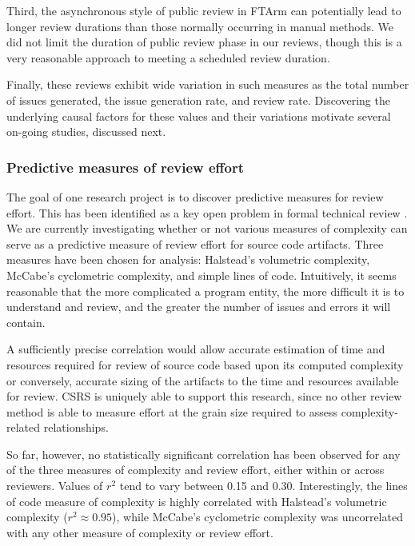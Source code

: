 Third, the asynchronous style of public review in FTArm can potentially
lead to longer review durations than those normally occurring in manual
methods. We did not limit the duration of public review phase in our
reviews, though this is a very reasonable approach to meeting a scheduled
review duration.

Finally, these reviews exhibit wide variation in such measures as the total
number of issues generated, the issue generation rate, and review rate.
Discovering the underlying causal factors for these values and their
variations motivate several on-going studies, discussed next.

\subsubsection{Predictive measures of review effort}

The goal of one research project is to discover predictive measures for
review effort. This has been identified as a key open problem in formal
technical review \cite{Fagan86}.  We are currently investigating whether or
not various measures of complexity can serve as a predictive measure of
review effort for source code artifacts. Three measures have been chosen
for analysis: Halstead's volumetric complexity, McCabe's cyclometric
complexity, and simple lines of code.  Intuitively, it seems reasonable
that the more complicated a program entity, the more difficult it is to
understand and review, and the greater the number of issues and errors it
will contain.

A sufficiently precise correlation would allow accurate estimation of time
and resources required for review of source code based upon its computed
complexity or conversely, accurate sizing of the artifacts to the time and
resources available for review.  CSRS is uniquely able to support this
research, since no other review method is able to measure effort at the
grain size required to assess complexity-related relationships.

So far, however, no statistically significant correlation has been observed
for any of the three measures of complexity and review effort, either
within or across reviewers.  Values of $r^{2}$ tend to vary between 0.15
and 0.30.  Interestingly, the lines of code measure of complexity is highly
correlated with Halstead's volumetric complexity ($r^{2} \approx 0.95$),
while McCabe's cyclometric complexity was uncorrelated with any other
measure of complexity or review effort.

